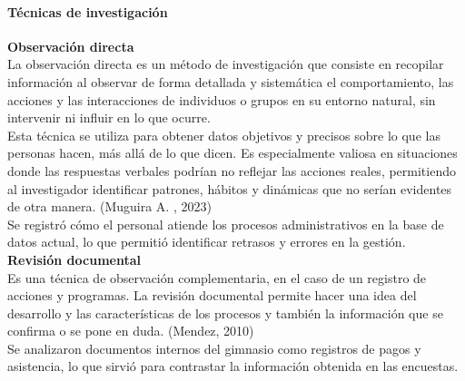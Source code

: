 \documentclass[12pt, letterpaper]{article}
\begin{document}
\paragraph{Técnicas de investigación}
\textbf{Observación directa}\\ 
La observación directa es un método de investigación que consiste en recopilar información al observar de forma detallada y sistemática el comportamiento, las acciones y las interacciones de individuos o grupos en su entorno natural, sin intervenir ni influir en lo que ocurre. \\
Esta técnica se utiliza para obtener datos objetivos y precisos sobre lo que las personas hacen, más allá de lo que dicen. Es especialmente valiosa en situaciones donde las respuestas verbales podrían no reflejar las acciones reales, permitiendo al investigador identificar patrones, hábitos y dinámicas que no serían evidentes de otra manera. (Muguira A. , 2023)\\
Se registró cómo el personal atiende los procesos administrativos en la base de datos actual, lo que permitió identificar retrasos y errores en la gestión.\\
\textbf{Revisión documental}\\
Es una técnica de observación complementaria, en el caso de un registro de acciones y programas. La revisión documental permite hacer una idea del desarrollo y las características de los procesos y también la información que se confirma o se pone en duda. (Mendez, 2010)\\
Se analizaron documentos internos del gimnasio como registros de pagos y asistencia, lo que sirvió para contrastar la información obtenida en las encuestas.\\
\end{document}
